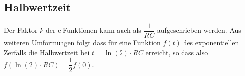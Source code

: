 \documentclass{article}
\begin{document}
\subsection{Halbwertzeit}
Der Faktor $k$ der e-Funktionen kann auch als $\dfrac{1}{RC}$ aufgeschrieben werden. Aus weiteren Umformungen folgt dass für eine Funktion $f(t)$ des exponentiellen Zerfalls die Halbwertzeit bei $t = \ln{(2)} \cdot RC$ erreicht, so dass also $f(\ln{(2)} \cdot RC) = \dfrac{1}{2} f(0)$. 
\end{document}
